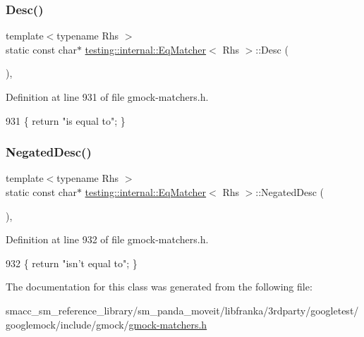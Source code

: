 \subsubsection{\texorpdfstring{Desc()}{Desc()}}
{\footnotesize\ttfamily template$<$typename Rhs $>$ \\
static const char$\ast$ \hyperlink{classtesting_1_1internal_1_1EqMatcher}{testing\+::internal\+::\+Eq\+Matcher}$<$ Rhs $>$\+::Desc (\begin{DoxyParamCaption}{ }\end{DoxyParamCaption})\hspace{0.3cm}{\ttfamily [inline]}, {\ttfamily [static]}}



Definition at line 931 of file gmock-\/matchers.\+h.


\begin{DoxyCode}
931 \{ \textcolor{keywordflow}{return} \textcolor{stringliteral}{"is equal to"}; \}
\end{DoxyCode}
\mbox{\label{classtesting_1_1internal_1_1EqMatcher_ae99a542c124694d5b91793a2df9202dc}} 
\subsubsection{\texorpdfstring{Negated\+Desc()}{NegatedDesc()}}
{\footnotesize\ttfamily template$<$typename Rhs $>$ \\
static const char$\ast$ \hyperlink{classtesting_1_1internal_1_1EqMatcher}{testing\+::internal\+::\+Eq\+Matcher}$<$ Rhs $>$\+::Negated\+Desc (\begin{DoxyParamCaption}{ }\end{DoxyParamCaption})\hspace{0.3cm}{\ttfamily [inline]}, {\ttfamily [static]}}



Definition at line 932 of file gmock-\/matchers.\+h.


\begin{DoxyCode}
932 \{ \textcolor{keywordflow}{return} \textcolor{stringliteral}{"isn't equal to"}; \}
\end{DoxyCode}


The documentation for this class was generated from the following file\+:\begin{DoxyCompactItemize}
\item 
smacc\+\_\+sm\+\_\+reference\+\_\+library/sm\+\_\+panda\+\_\+moveit/libfranka/3rdparty/googletest/googlemock/include/gmock/\hyperlink{gmock-matchers_8h}{gmock-\/matchers.\+h}\end{DoxyCompactItemize}
